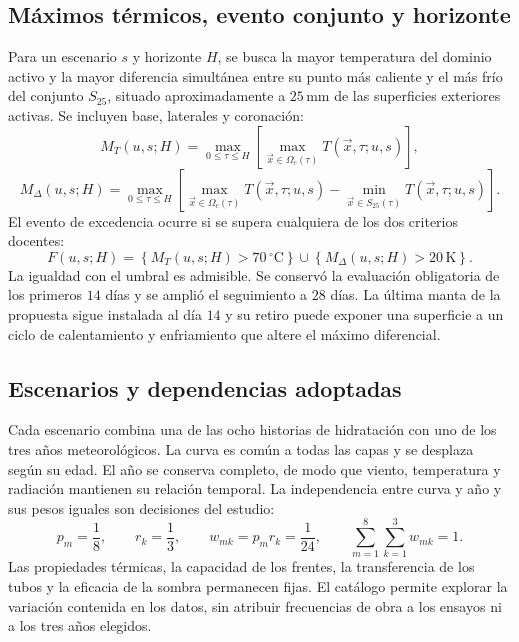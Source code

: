 \subsection{Máximos térmicos, evento conjunto y horizonte}
Para un escenario $s$ y horizonte $H$, se busca la mayor temperatura del dominio activo y la mayor diferencia simultánea entre su punto más caliente y el más frío del conjunto $S_{25}$, situado aproximadamente a $25\,\mathrm{mm}$ de las superficies exteriores activas. Se incluyen base, laterales y coronación:
\begin{equation}
  M_T(u,s;H)=\max_{0\leq\tau\leq H}
  \left[\max_{\vec x\in\Omega_c(\tau)}T(\vec x,\tau;u,s)\right],
  \label{eq:maximo-temperatura-escenario}
\end{equation}
\begin{equation}
  M_\Delta(u,s;H)=\max_{0\leq\tau\leq H}
  \left[
  \max_{\vec x\in\Omega_c(\tau)}T(\vec x,\tau;u,s)
  -\min_{\vec x\in S_{25}(\tau)}T(\vec x,\tau;u,s)
  \right].
  \label{eq:maximo-diferencial-escenario}
\end{equation}
El evento de excedencia ocurre si se supera cualquiera de los dos criterios docentes:
\begin{equation}
  F(u,s;H)=
  \left\{M_T(u,s;H)>70\,{}^\circ\mathrm C\right\}
  \cup
  \left\{M_\Delta(u,s;H)>20\,\mathrm K\right\}.
  \label{eq:evento-conjunto}
\end{equation}
La igualdad con el umbral es admisible. Se conservó la evaluación obligatoria de los primeros $14$ días y se amplió el seguimiento a $28$ días. La última manta de la propuesta sigue instalada al día $14$ y su retiro puede exponer una superficie a un ciclo de calentamiento y enfriamiento que altere el máximo diferencial.

\subsection{Escenarios y dependencias adoptadas}
Cada escenario combina una de las ocho historias de hidratación con uno de los tres años meteorológicos. La curva es común a todas las capas y se desplaza según su edad. El año se conserva completo, de modo que viento, temperatura y radiación mantienen su relación temporal. La independencia entre curva y año y sus pesos iguales son decisiones del estudio:
\begin{equation}
  p_m=\frac{1}{8},\qquad r_k=\frac{1}{3},\qquad
  w_{mk}=p_mr_k=\frac{1}{24},\qquad
  \sum_{m=1}^{8}\sum_{k=1}^{3}w_{mk}=1.
  \label{eq:pesos-escenarios}
\end{equation}
Las propiedades térmicas, la capacidad de los frentes, la transferencia de los tubos y la eficacia de la sombra permanecen fijas. El catálogo permite explorar la variación contenida en los datos, sin atribuir frecuencias de obra a los ensayos ni a los tres años elegidos.

